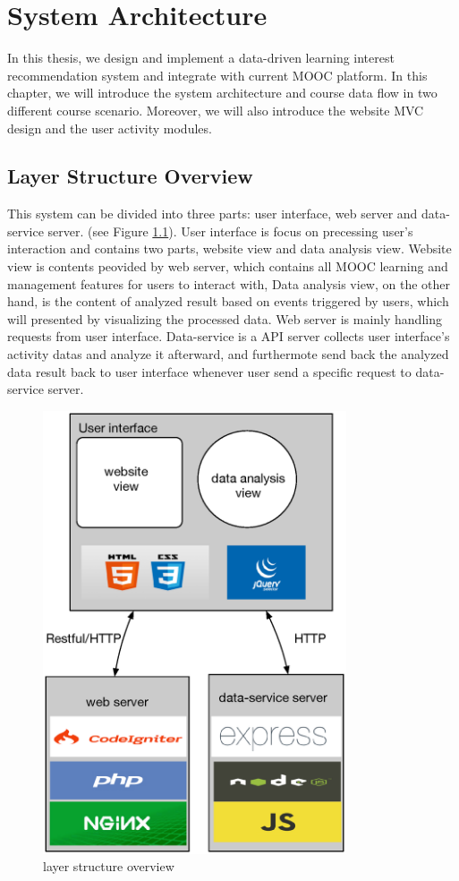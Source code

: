 \chapter{System Architecture}\label{cha:Architecture}
In this thesis, we design and implement a data-driven learning interest recommendation system and integrate with current MOOC platform.
In this chapter, we  will introduce the system architecture and course data flow in two different course scenario.
Moreover, we will also introduce the website MVC design and the user activity modules.

\section{Layer Structure Overview}
This system can be divided into three parts: user interface, web server and data-service server. (see Figure \ref{fig:layer-overview}).
User interface is focus on precessing user's interaction and contains two parts, website view and data analysis view.
Website view is contents peovided by web server, which contains all MOOC learning and management features for users to interact with,
Data analysis view, on the other hand, is the content of analyzed result based on events triggered by users, which will presented by visualizing the processed data.
Web server is mainly handling requests from user interface.
Data-service is a API server collects user interface's activity datas and analyze it afterward, and furthermote send back the analyzed data result back to user interface whenever user send a specific request to data-service server.

\begin{figure}[H]
    \centering
    \includegraphics[width = 0.8\textwidth]{fig/layer-structure-overview.eps}
    \caption{layer structure overview}
    \label{fig:layer-overview}
\end{figure}


